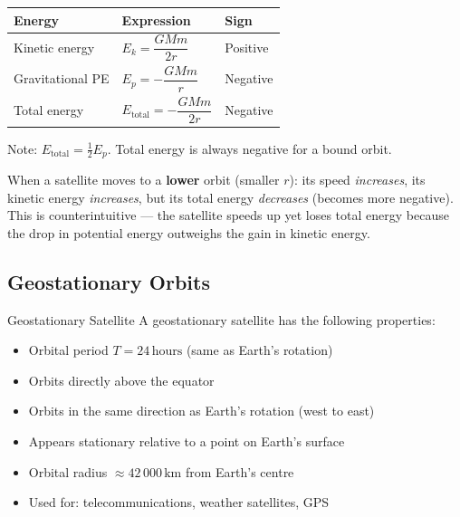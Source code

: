 \begin{center}
\renewcommand{\arraystretch}{1.5}
\begin{tabular}{lll}
\toprule
\textbf{Energy} & \textbf{Expression} & \textbf{Sign} \\
\midrule
Kinetic energy       & $E_k = \dfrac{GMm}{2r}$  & Positive \\[6pt]
Gravitational PE     & $E_p = -\dfrac{GMm}{r}$  & Negative \\[6pt]
Total energy         & $E_{\text{total}} = -\dfrac{GMm}{2r}$ & Negative \\
\bottomrule
\end{tabular}
\end{center}

\medskip
Note: $E_{\text{total}} = \tfrac{1}{2}E_p$. Total energy is always negative for a
bound orbit.

\begin{warnbox}
When a satellite moves to a \textbf{lower} orbit (smaller $r$): its speed
\emph{increases}, its kinetic energy \emph{increases}, but its total energy
\emph{decreases} (becomes more negative). This is counterintuitive — the satellite
speeds up yet loses total energy because the drop in potential energy outweighs the
gain in kinetic energy.
\end{warnbox}

\subsection{Geostationary Orbits}

\begin{defnbox}{Geostationary Satellite}
A geostationary satellite has the following properties:
\begin{itemize}[nosep]
  \item Orbital period $T = 24\,\text{hours}$ (same as Earth's rotation)
  \item Orbits directly above the equator
  \item Orbits in the same direction as Earth's rotation (west to east)
  \item Appears stationary relative to a point on Earth's surface
  \item Orbital radius $\approx 42\,000\,\text{km}$ from Earth's centre
  \item Used for: telecommunications, weather satellites, GPS
\end{itemize}
\end{defnbox}

